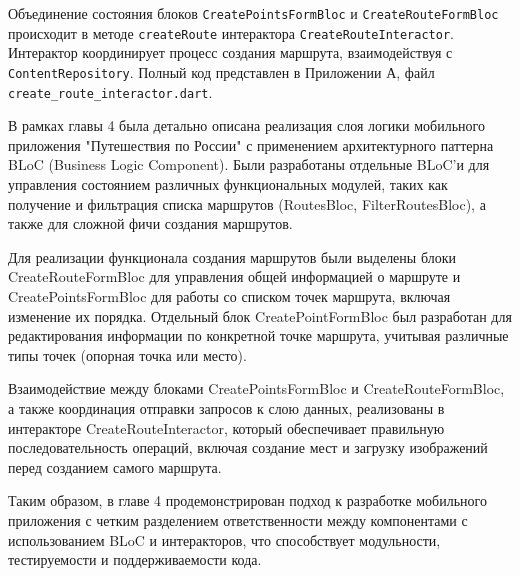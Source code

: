 Объединение состояния блоков \texttt{CreatePointsFormBloc} и \texttt{CreateRouteFormBloc}  происходит в методе \texttt{createRoute} интерактора \texttt{CreateRouteInteractor}. Интерактор координирует процесс создания маршрута, взаимодействуя с \texttt{ContentRepository}. Полный код представлен в Приложении А, файл \texttt{create\_route\_interactor.dart}.

В рамках главы 4 была детально описана реализация слоя логики мобильного приложения "Путешествия по России" с применением архитектурного паттерна BLoC (Business Logic Component). Были разработаны отдельные BLoC'и для управления состоянием различных функциональных модулей, таких как получение и фильтрация списка маршрутов (RoutesBloc, FilterRoutesBloc), а также для сложной фичи создания маршрутов.  

Для реализации функционала создания маршрутов были выделены блоки CreateRouteFormBloc  для управления общей информацией о маршруте и CreatePointsFormBloc  для работы со списком точек маршрута, включая изменение их порядка. Отдельный блок CreatePointFormBloc  был разработан для редактирования информации по конкретной точке маршрута, учитывая различные типы точек (опорная точка или место).  

Взаимодействие между блоками CreatePointsFormBloc и CreateRouteFormBloc, а также координация отправки запросов к слою данных, реализованы в интеракторе CreateRouteInteractor, который обеспечивает правильную последовательность операций, включая создание мест и загрузку изображений перед созданием самого маршрута.  

Таким образом, в главе 4 продемонстрирован подход к разработке мобильного приложения с четким разделением ответственности между компонентами с использованием BLoC и интеракторов, что способствует модульности, тестируемости и поддерживаемости кода.


